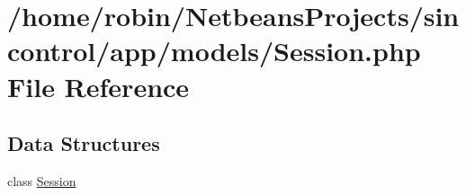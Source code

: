 \hypertarget{_session_8php}{}\section{/home/robin/\+Netbeans\+Projects/sincontrol/app/models/\+Session.php File Reference}
\label{_session_8php}
\subsection*{Data Structures}
\begin{DoxyCompactItemize}
\item 
class \hyperlink{class_session}{Session}
\end{DoxyCompactItemize}
